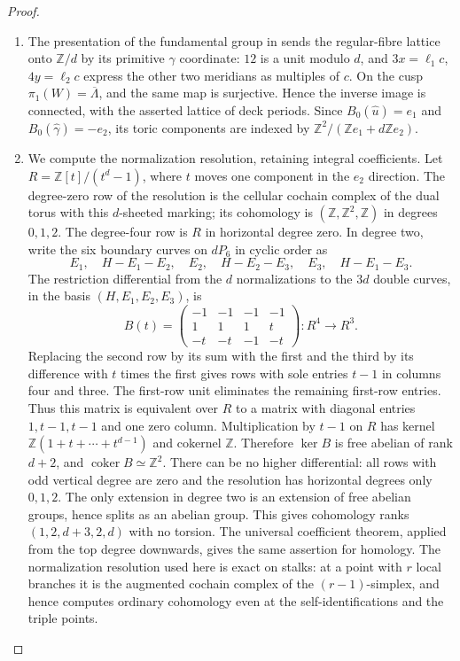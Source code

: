 \begin{proof}
\begin{enumerate}[label=\arabic*.,leftmargin=*]
\item The presentation of the fundamental group in
\cite[Theorem~7.17]{AC26} sends the regular-fibre lattice onto
$\mathbb Z/d$ by its primitive $\gamma$ coordinate: $12$ is a unit
modulo $d$, and $3x=\ell_1c$, $4y=\ell_2c$ express the other two
meridians as multiples of $c$. On the cusp $\pi_1(W)=\overline\Lambda$,
and the same map is surjective. Hence the inverse image is connected,
with the asserted lattice of deck periods. Since
$B_0(\widehat u)=e_1$ and $B_0(\widehat\gamma)=-e_2$, its toric
components are indexed by $\mathbb Z^2/(\mathbb Ze_1+d\mathbb Ze_2)$.

\item We compute the normalization resolution, retaining integral coefficients.
Let $R=\mathbb Z[t]/(t^d-1)$, where $t$ moves one component in the
$e_2$ direction. The degree-zero row of the resolution is the cellular
cochain complex of the dual torus with this $d$-sheeted marking; its
cohomology is $(\mathbb Z,\mathbb Z^2,\mathbb Z)$ in degrees $0,1,2$.
The degree-four row is $R$ in horizontal degree zero. In degree two,
write the six boundary curves on $dP_6$ in cyclic order as
\[
 E_1,\quad H-E_1-E_2,\quad E_2,\quad H-E_2-E_3,
 \quad E_3,\quad H-E_1-E_3.
\]
The restriction differential from the $d$ normalizations to the $3d$
double curves, in the basis $(H,E_1,E_2,E_3)$, is
\[
 B(t)=
 \begin{pmatrix}
 -1&-1&-1&-1\\
 1&1&1&t\\
 -t&-t&-1&-t
 \end{pmatrix}:R^4\longrightarrow R^3.
\]
Replacing the second row by its sum with the first and the third by
its difference with $t$ times the first gives rows with sole entries
$t-1$ in columns four and three. The first-row unit eliminates the
remaining first-row entries. Thus this matrix is equivalent over $R$
to a matrix with diagonal entries $1,t-1,t-1$ and one zero column.
Multiplication by $t-1$ on $R$ has kernel $\mathbb Z(1+t+\cdots+t^{d-1})$
and cokernel $\mathbb Z$. Therefore $\ker B$ is free abelian of rank
$d+2$, and $\operatorname{coker}B\simeq\mathbb Z^2$.
There can be no higher differential: all rows with odd vertical degree
are zero and the resolution has horizontal degrees only $0,1,2$.
The only extension in degree two is an extension of free abelian
groups, hence splits as an abelian group. This gives cohomology ranks
$(1,2,d+3,2,d)$ with no torsion. The universal coefficient theorem,
applied from the top degree downwards, gives the same assertion for
homology. The normalization resolution used here is exact on stalks:
at a point with $r$ local branches it is the augmented cochain complex
of the $(r-1)$-simplex, and hence computes ordinary cohomology even at
the self-identifications and the triple points.
\end{enumerate}
\end{proof}

